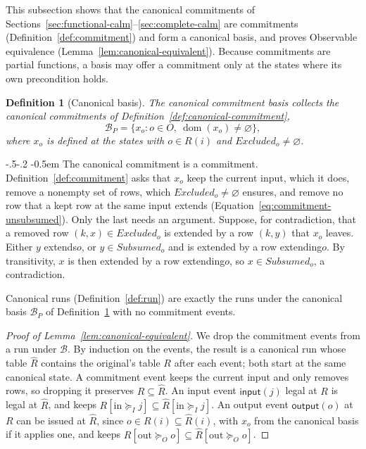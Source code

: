 \documentclass[sigconf]{cidr-2027}
\makeatletter
\newtheorem{definition}{Definition}
\theoremstyle{remark}
\renewcommand\paragraph{\@startsection{paragraph}{4}{\z@}%
  {-.5\baselineskip \@plus -2\p@ \@minus -.2\p@}%
  {-0.5em}%
  {\normalfont\bfseries}}
\newcommand{\InputGe}{\succeq_I}
\newcommand{\OutputGe}{\succeq_O}
\newcommand{\commitment}{commitment\xspace}
\newcommand{\commitments}{commitments\xspace}
\newcommand{\outrel}{extends\xspace}          %
\newcommand{\outrelpart}{extending\xspace}    %
\newcommand{\outrelpast}{extended\xspace}     %
\newcommand{\Subsumed}{\mathit{Subsumed}}
\newcommand{\Excluded}{\mathit{Excluded}}
\makeatother
\begin{document}
This subsection shows that the canonical \commitments of
Sections~\ref{sec:functional-calm}--\ref{sec:complete-calm} are \commitments
(Definition~\ref{def:commitment}) and form a canonical basis, and proves
Observable equivalence (Lemma~\ref{lem:canonical-equivalent}). Because
\commitments are partial functions, a basis may offer a \commitment only at the
states where its own precondition holds.

\begin{definition}[Canonical basis]
\label{def:canonical-commitment-basis}
The \emph{canonical \commitment basis} collects the canonical \commitments of
Definition~\ref{def:canonical-commitment},
\begin{equation}
  \mathcal B_P
    =\{x_o:o\in O,\ \operatorname{dom}(x_o)\neq\varnothing\},
  \label{eq:canonical-commitment-basis-relational}
\end{equation}
where $x_o$ is defined at the states with $o\in R(i)$ and $\Excluded_o\neq\varnothing$.
\end{definition}

\paragraph{The canonical \commitment is a \commitment.}
Definition~\ref{def:commitment} asks that $x_o$ keep the current input, which
it does, remove a nonempty set of rows, which $\Excluded_o\neq\varnothing$
ensures, and remove no row that a kept row at the same input \outrel
(Equation~\ref{eq:commitment-unsubsumed}). Only the last needs an argument. Suppose, for contradiction, that a removed row $(k,x)\in\Excluded_o$ is
\outrelpast by a row $(k,y)$ that $x_o$ leaves. Either $y$ \outrel $o$, or
$y\in\Subsumed_o$ and is \outrelpast by a row \outrelpart $o$. By
transitivity, $x$ is then \outrelpast by a row \outrelpart $o$, so
$x\in\Subsumed_o$, a contradiction.

Canonical runs (Definition~\ref{def:run}) are exactly the runs under the
canonical basis $\mathcal B_P$ of Definition~\ref{def:canonical-commitment-basis}
with no \commitment events.

\begin{proof}[Proof of Lemma~\ref{lem:canonical-equivalent}]
We drop the \commitment events from a run under $\mathcal B$. By induction on
the events, the result is a canonical run whose table $\widehat R$ contains
the original's table $R$ after each event; both start at the same canonical
state. A \commitment event keeps the current input and only removes rows, so
dropping it preserves $R\subseteq\widehat R$. An input event
$\mathsf{input}(j)$ legal at $R$ is legal at $\widehat R$, and keeps
$R[\mathrm{in}\InputGe j]\subseteq\widehat R[\mathrm{in}\InputGe j]$. An
output event $\mathsf{output}(o)$ at $R$ can be issued at $\widehat R$, since
$o\in R(i)\subseteq\widehat R(i)$, with $x_o$ from the canonical basis if it
applies one, and keeps
$R[\mathrm{out}\OutputGe o]\subseteq\widehat R[\mathrm{out}\OutputGe o]$.
\end{proof}
\end{document}
